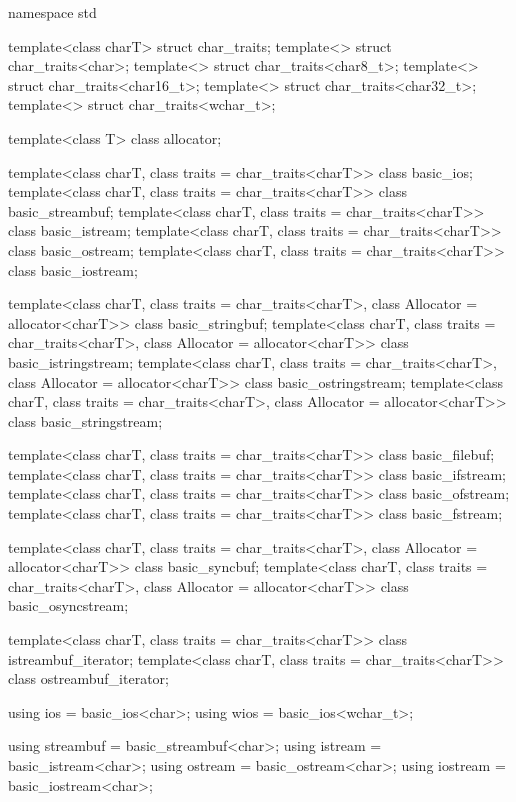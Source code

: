 \begin{codeblock}
namespace std {
  template<class charT> struct char_traits;
  template<> struct char_traits<char>;
  template<> struct char_traits<char8_t>;
  template<> struct char_traits<char16_t>;
  template<> struct char_traits<char32_t>;
  template<> struct char_traits<wchar_t>;

  template<class T> class allocator;

  template<class charT, class traits = char_traits<charT>>
    class basic_ios;
  template<class charT, class traits = char_traits<charT>>
    class basic_streambuf;
  template<class charT, class traits = char_traits<charT>>
    class basic_istream;
  template<class charT, class traits = char_traits<charT>>
    class basic_ostream;
  template<class charT, class traits = char_traits<charT>>
    class basic_iostream;

  template<class charT, class traits = char_traits<charT>,
           class Allocator = allocator<charT>>
    class basic_stringbuf;
  template<class charT, class traits = char_traits<charT>,
           class Allocator = allocator<charT>>
    class basic_istringstream;
  template<class charT, class traits = char_traits<charT>,
           class Allocator = allocator<charT>>
    class basic_ostringstream;
  template<class charT, class traits = char_traits<charT>,
           class Allocator = allocator<charT>>
    class basic_stringstream;

  template<class charT, class traits = char_traits<charT>>
    class basic_filebuf;
  template<class charT, class traits = char_traits<charT>>
    class basic_ifstream;
  template<class charT, class traits = char_traits<charT>>
    class basic_ofstream;
  template<class charT, class traits = char_traits<charT>>
    class basic_fstream;

  template<class charT, class traits = char_traits<charT>,
           class Allocator = allocator<charT>>
    class basic_syncbuf;
  template<class charT, class traits = char_traits<charT>,
           class Allocator = allocator<charT>>
    class basic_osyncstream;

  template<class charT, class traits = char_traits<charT>>
    class istreambuf_iterator;
  template<class charT, class traits = char_traits<charT>>
    class ostreambuf_iterator;

  using ios  = basic_ios<char>;
  using wios = basic_ios<wchar_t>;

  using streambuf = basic_streambuf<char>;
  using istream   = basic_istream<char>;
  using ostream   = basic_ostream<char>;
  using iostream  = basic_iostream<char>;

}
\end{codeblock}
